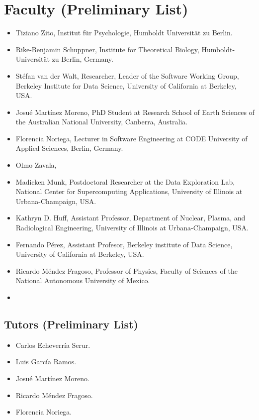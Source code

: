 \documentclass{article}[11pt]
\begin{document}
\section*{Faculty (Preliminary List)}
\begin{itemize} 
    \item Tiziano Zito, Institut f\"ur Psychologie, Humboldt Universit\"at zu Berlin.    
    \item Rike-Benjamin Schuppner, Institute for Theoretical Biology, Humboldt-Universit\"at zu Berlin, Germany.
    \item St\'efan van der Walt, Researcher, Leader of the Software Working Group, Berkeley Institute for Data Science, University of California at Berkeley, USA.
    \item Josu\'e Mart\'inez Moreno, PhD Student at Research School of Earth Sciences of the Australian National University, Canberra, Australia.
    \item  Florencia Noriega, Lecturer in Software Engineering at CODE University of Applied Sciences, Berlin, Germany.
    \item Olmo Zavala, 
    \item Madicken Munk, Postdoctoral Researcher at the  Data Exploration Lab, National Center for Supercomputing Applications, University of Illinois at Urbana-Champaign, USA.
    \item Kathryn D. Huff, Assistant Professor, Department of Nuclear, Plasma, and Radiological Engineering, University of Illinois at Urbana-Champaign, USA.
    \item Fernando P\'erez, Assistant Profesor, Berkeley institute of Data Science, University of California at Berkeley, USA.
    \item Ricardo M\'endez Fragoso, Professor of Physics, Faculty of Sciences of the National Autonomous University of Mexico.
    \item {}
\end{itemize}

\subsection*{Tutors (Preliminary List)}
\begin{itemize}
\item Carlos Echeverr\'ia Serur.
\item Luis Garc\'ia Ramos.
\item Josu\'e Mart\'inez Moreno.
\item Ricardo M\'endez Fragoso.
\item Florencia Noriega.
\end{itemize}
\end{document}
